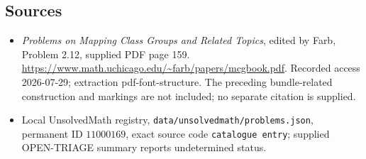\documentclass[11pt]{article}
\begin{document}
\subsection{Sources}
\begin{itemize}
\item \emph{Problems on Mapping Class Groups and Related Topics}, edited by Farb, Problem 2.12, supplied PDF page 159. \url{https://www.math.uchicago.edu/~farb/papers/mcgbook.pdf}. Recorded access 2026-07-29; extraction pdf-font-structure. The preceding bundle-related construction and markings are not included; no separate citation is supplied.
\item Local UnsolvedMath registry, \texttt{data/unsolvedmath/problems.json}, permanent ID \(11000169\), exact source code \texttt{catalogue entry}; supplied OPEN-TRIAGE summary reports undetermined status.
\end{itemize}
\end{document}
